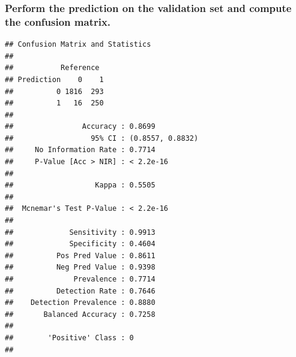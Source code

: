 \documentclass[]{article}
\newenvironment{Shaded}{\begin{snugshade}}{\end{snugshade}}
\newcommand{\CommentTok}[1]{\textcolor[rgb]{0.56,0.35,0.01}{\textit{#1}}}
\newcommand{\KeywordTok}[1]{\textcolor[rgb]{0.13,0.29,0.53}{\textbf{#1}}}
\newcommand{\NormalTok}[1]{#1}
\newcommand{\OperatorTok}[1]{\textcolor[rgb]{0.81,0.36,0.00}{\textbf{#1}}}
\begin{document}
\hypertarget{perform-the-prediction-on-the-validation-set-and-compute-the-confusion-matrix.}{%
\subsubsection{Perform the prediction on the validation set and compute
the confusion
matrix.}\label{perform-the-prediction-on-the-validation-set-and-compute-the-confusion-matrix.}}

\begin{Shaded}
\end{Shaded}

\begin{verbatim}
## Confusion Matrix and Statistics
## 
##           Reference
## Prediction    0    1
##          0 1816  293
##          1   16  250
##                                           
##                Accuracy : 0.8699          
##                  95% CI : (0.8557, 0.8832)
##     No Information Rate : 0.7714          
##     P-Value [Acc > NIR] : < 2.2e-16       
##                                           
##                   Kappa : 0.5505          
##                                           
##  Mcnemar's Test P-Value : < 2.2e-16       
##                                           
##             Sensitivity : 0.9913          
##             Specificity : 0.4604          
##          Pos Pred Value : 0.8611          
##          Neg Pred Value : 0.9398          
##              Prevalence : 0.7714          
##          Detection Rate : 0.7646          
##    Detection Prevalence : 0.8880          
##       Balanced Accuracy : 0.7258          
##                                           
##        'Positive' Class : 0               
## 
\end{verbatim}

\begin{Shaded}
\end{Shaded}
\end{document}
